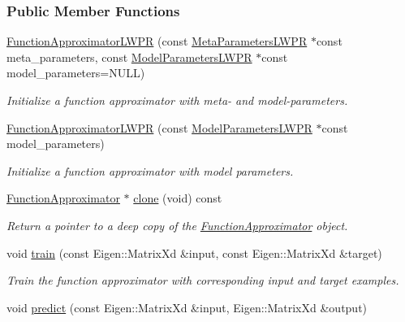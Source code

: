 \subsubsection*{Public Member Functions}
\begin{DoxyCompactItemize}
\item 
\hyperlink{classDmpBbo_1_1FunctionApproximatorLWPR_ae20c704e818a6af0beb9189a4c37927b}{Function\+Approximator\+L\+W\+P\+R} (const \hyperlink{classDmpBbo_1_1MetaParametersLWPR}{Meta\+Parameters\+L\+W\+P\+R} $\ast$const meta\+\_\+parameters, const \hyperlink{classDmpBbo_1_1ModelParametersLWPR}{Model\+Parameters\+L\+W\+P\+R} $\ast$const model\+\_\+parameters=N\+U\+L\+L)
\begin{DoxyCompactList}\small\item\em Initialize a function approximator with meta-\/ and model-\/parameters. \end{DoxyCompactList}\item 
\hyperlink{classDmpBbo_1_1FunctionApproximatorLWPR_a4886bc268182a27dd0bdc62e9022d700}{Function\+Approximator\+L\+W\+P\+R} (const \hyperlink{classDmpBbo_1_1ModelParametersLWPR}{Model\+Parameters\+L\+W\+P\+R} $\ast$const model\+\_\+parameters)
\begin{DoxyCompactList}\small\item\em Initialize a function approximator with model parameters. \end{DoxyCompactList}\item 
\hyperlink{classDmpBbo_1_1FunctionApproximator}{Function\+Approximator} $\ast$ \hyperlink{classDmpBbo_1_1FunctionApproximatorLWPR_ad792a46ac006916c5c1ffed2fa42dd24}{clone} (void) const 
\begin{DoxyCompactList}\small\item\em Return a pointer to a deep copy of the \hyperlink{classDmpBbo_1_1FunctionApproximator}{Function\+Approximator} object. \end{DoxyCompactList}\item 
void \hyperlink{classDmpBbo_1_1FunctionApproximatorLWPR_ac453415cf4894aba45e8db6ebc4cd4dc}{train} (const Eigen\+::\+Matrix\+Xd \&input, const Eigen\+::\+Matrix\+Xd \&target)
\begin{DoxyCompactList}\small\item\em Train the function approximator with corresponding input and target examples. \end{DoxyCompactList}\item 
void \hyperlink{classDmpBbo_1_1FunctionApproximatorLWPR_afe8dcfb9cd065dfde38dce1f6e6cd3e6}{predict} (const Eigen\+::\+Matrix\+Xd \&input, Eigen\+::\+Matrix\+Xd \&output)

\end{DoxyCompactItemize}
